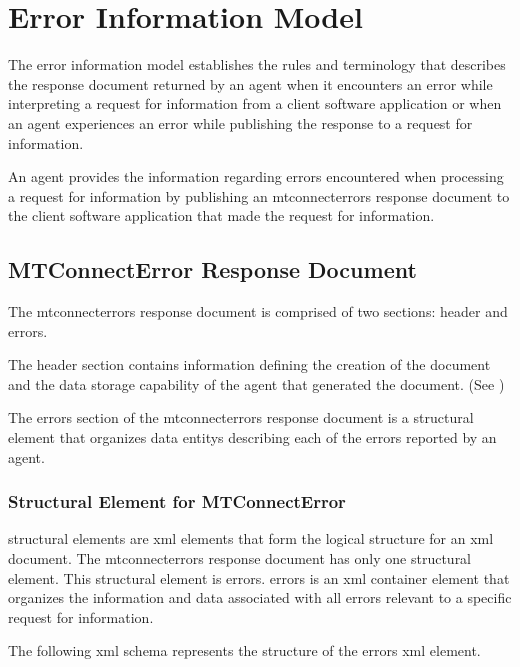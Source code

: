 \documentclass{mtconnect}	%
\begin{document}
\section{Error Information Model}
\label{sec:Error Information Model}

The \gls{error information model} establishes the rules and terminology that describes the \gls{response document} returned by an \gls{agent} when it encounters an error while interpreting a \gls{request} for information from a client software application or when an \gls{agent} experiences an error while publishing the \gls{response} to a \gls{request} for information.      

An \gls{agent} provides the information regarding errors encountered when processing a \gls{request} for information by publishing an \gls{mtconnecterrors response document} to the client software application that made the \gls{request} for information.

\subsection{MTConnectError Response Document}

The \gls{mtconnecterrors response document} is comprised of two sections: \gls{header} and \gls{errors}.

The \gls{header} section contains information defining the creation of the document and the data storage capability of the \gls{agent} that generated the document.  (See )

The \gls{errors} section of the \gls{mtconnecterrors response document} is a \gls{structural element} that organizes \glspl{data entity} describing each of the errors reported by an \gls{agent}.   

\subsubsection{Structural Element for MTConnectError}

\glspl{structural element} are \gls{xml} elements that form the logical structure for an \gls{xml} document.  The \gls{mtconnecterrors response document} has only one \gls{structural element}.  This \gls{structural element} is \gls{errors}.   \gls{errors} is an \gls{xml} container element that organizes the information and data associated with all errors relevant to a specific \gls{request} for information.

The following \gls{xml schema} represents the structure of the \gls{errors} \gls{xml} element.   
\end{document}
